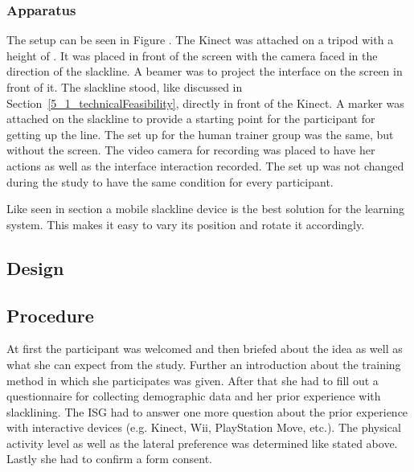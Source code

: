 \subsubsection{Apparatus}
The setup can be seen in Figure \todo{[figure]}. The Kinect was attached on a tripod with a height of \todo{90 cm}. It was placed in front of the screen with the camera faced in the direction of the slackline. A beamer was  to project the interface on the screen in front of it. The slackline stood, like discussed in Section~\ref{5_1_technicalFeasibility}, directly in front of the Kinect. A marker was attached on the slackline to provide a starting point for the participant for getting up the line.
The set up for the human trainer group was the same, but without the screen. The video camera for recording was placed  to have her actions as well as the interface interaction recorded. The set up was not changed during the study to have the same condition for every participant.

Like seen in section \textit{} a mobile slackline device is the best solution for the learning system. This makes it easy to vary its position and rotate it accordingly. 

\todo{[Figure]}

\subsection{Design}

\subsection{Procedure}
At first the participant was welcomed and then briefed about the idea as well as what she can expect from the study. Further an introduction about the training method in which she participates was given. After that she had to fill out a questionnaire for collecting demographic data and her prior experience with slacklining. The ISG had to answer one more question about the prior experience with interactive devices (e.g. Kinect, Wii, PlayStation Move, etc.).
The physical activity level as well as the lateral preference was determined like stated above. Lastly she had to confirm a form consent.

